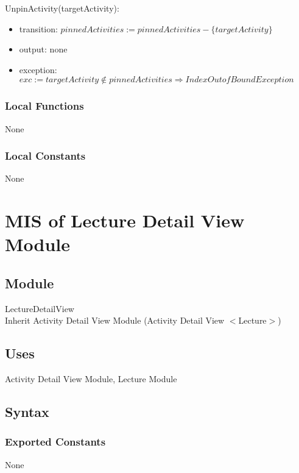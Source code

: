 \documentclass[12pt, titlepage]{article}
\begin{document}
\noindent UnpinActivity(targetActivity):
\begin{itemize}
\item transition: $pinnedActivities := pinnedActivities - \{targetActivity\}$
\item output: none
\item exception: $exc := targetActivity \notin pinnedActivities \Rightarrow IndexOutofBound Exception$
\end{itemize}

\subsubsection{Local Functions}

None

\subsubsection{Local Constants}

None

\newpage

\section{MIS of Lecture Detail View Module} \label{mLDV}

\subsection{Module}

LectureDetailView\\
Inherit Activity Detail View Module (Activity Detail View $<$Lecture$>$)
\subsection{Uses}

Activity Detail View Module, Lecture Module

\subsection{Syntax}

\subsubsection{Exported Constants}

None
\end{document}
